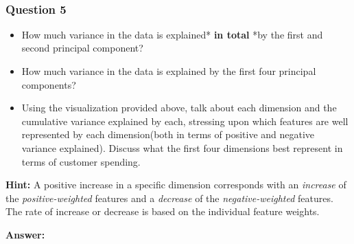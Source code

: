 \documentclass[11pt]{article}
\providecommand{\tightlist}{%
      \setlength{\itemsep}{0pt}\setlength{\parskip}{0pt}}
\begin{document}
    \begin{center}
    \end{center}
    { \hspace*{\fill} \\}
    
    \hypertarget{question-5}{%
\subsubsection{Question 5}\label{question-5}}

\begin{itemize}
\tightlist
\item
  How much variance in the data is explained* \textbf{in total} *by the
  first and second principal component?
\item
  How much variance in the data is explained by the first four principal
  components?
\item
  Using the visualization provided above, talk about each dimension and
  the cumulative variance explained by each, stressing upon which
  features are well represented by each dimension(both in terms of
  positive and negative variance explained). Discuss what the first four
  dimensions best represent in terms of customer spending.
\end{itemize}

\textbf{Hint:} A positive increase in a specific dimension corresponds
with an \emph{increase} of the \emph{positive-weighted} features and a
\emph{decrease} of the \emph{negative-weighted} features. The rate of
increase or decrease is based on the individual feature weights.

    \textbf{Answer:}
\end{document}
